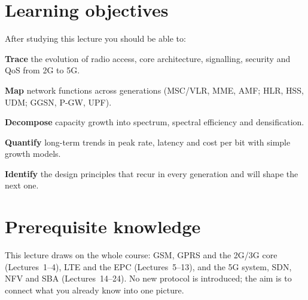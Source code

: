 \documentclass[11pt,a4paper]{article}
\begin{document}
\ACNcover

\section{Learning objectives}
After studying this lecture you should be able to:
\begin{objectives}
  \item \textbf{Trace} the evolution of radio access, core architecture, signalling, security and QoS from 2G to 5G.
  \item \textbf{Map} network functions across generations (MSC/VLR, MME, AMF; HLR, HSS, UDM; GGSN, P-GW, UPF).
  \item \textbf{Decompose} capacity growth into spectrum, spectral efficiency and densification.
  \item \textbf{Quantify} long-term trends in peak rate, latency and cost per bit with simple growth models.
  \item \textbf{Identify} the design principles that recur in every generation and will shape the next one.
\end{objectives}

\section{Prerequisite knowledge}
This lecture draws on the whole course: GSM, GPRS and the 2G/3G core (Lectures~1--4), LTE and the EPC (Lectures~5--13), and the 5G system,
SDN, NFV and SBA (Lectures~14--24). No new protocol is introduced; the aim is to connect what you already know into one picture.
\end{document}
